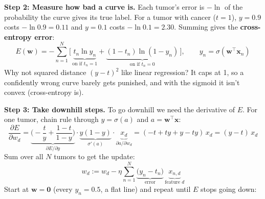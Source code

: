 \textbf{Step 2: Measure how bad a curve is.} Each tumor's error is $-\ln$ of the probability the curve gives its true label. For a tumor with cancer ($t = 1$), $y = 0.9$ costs $-\ln 0.9 = 0.11$ and $y = 0.1$ costs $-\ln 0.1 = 2.30$. Summing gives the \textbf{cross-entropy error}:
\[
E(\mathbf{w}) = -\sum_{n=1}^{N} \Big[\, \underbrace{t_n \ln y_n}_{\text{on if } t_n = 1} + \underbrace{(1 - t_n)\ln(1 - y_n)}_{\text{on if } t_n = 0} \,\Big],
\qquad y_n = \sigma(\mathbf{w}^\top\mathbf{x}_n)
\]
Why not squared distance $(y - t)^2$ like linear regression? It caps at 1, so a confidently wrong curve barely gets punished, and with the sigmoid it isn't convex (cross-entropy is).

\begin{keeptogether}
\textbf{Step 3: Take downhill steps.} To go downhill we need the derivative of $E$. For one tumor, chain rule through $y = \sigma(a)$ and $a = \mathbf{w}^\top\mathbf{x}$:
\[
\frac{\partial E}{\partial w_d}
= \underbrace{\Big(-\frac{t}{y} + \frac{1-t}{1-y}\Big)}_{\partial E / \partial y}
\cdot \underbrace{y(1-y)}_{\sigma'(a)}
\cdot \underbrace{x_d}_{\partial a / \partial w_d}
= (-t + ty + y - ty)\,x_d
= (y - t)\, x_d
\]
Sum over all $N$ tumors to get the update:
\[
w_d := w_d - \eta \sum_{n=1}^{N} \underbrace{\big(y_n - t_n\big)}_{\text{error}}\, \underbrace{x_{n,d}}_{\text{feature } d}
\]
Start at $\mathbf{w} = \mathbf{0}$ (every $y_n = 0.5$, a flat line) and repeat until $E$ stops going down:


\end{keeptogether}
